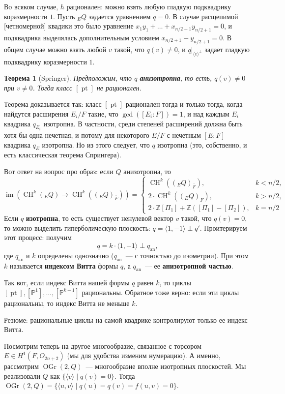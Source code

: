 \documentclass[a4paper]{article}
\DeclareMathOperator{\im}{im}
\DeclareMathOperator{\CH}{CH}
\DeclareMathOperator{\pt}{pt}
\DeclareMathOperator{\OGr}{OGr}
\DeclareMathOperator{\an}{an}
\newcommand{\term}{\textbf}
\newtheorem{theorem}{Теорема}[subsection]
\theoremstyle{definition}
\newcommand{\la}{\langle}
\newcommand{\ra}{\rangle}
\newcommand{\ol}{\overline}
\begin{document}
Во всяком случае, $h$ рационален: можно взять любую гладкую
подквадрику коразмерности $1$.
Пусть ${}_{E}Q$ задается уравнением $q=0$.
В случае расщепимой [четномерной] квадики это было уравнение
$x_1y_1 + \dots + x_{n/2+1}y_{n/2+1} = 0$,
и подквадрика выделялась дополнительным условием $x_{n/2+1} - y_{n/2+1}=0$.
В общем случае можно взять любой $v$ такой, что $q(v)\neq 0$,
и $q|_{\la v\ra^{\perp}}$ задает гладкую подквадрику коразмерности $1$.

\begin{theorem}[Springer]
Предположим, что $q$ \term{анизотропна}, то есть,
$q(v)\neq 0$ при $v\neq 0$.
Тогда класс $[\pt]$ не рационален.
\end{theorem}

Теорема доказывается так: класс $[\pt]$ рационален тогда и только тогда,
когда найдутся расширения $E_i/F$  такие, что
$\gcd([E_i:F]) = 1$, и над каждым $E_i$ квадрика
$q_{E_i}$ изотропна.
В частности, среди степеней расширений должна быть хотя бы одна нечетная,
и потому для некоторого $E/F$ с нечетным $[E:F]$ квадрика $q_E$
изотропна.
Но из этого следует, что $q$ изотропна (это, собственно, и есть
классическая теорема Спрингера).

Вот ответ на вопрос про образ: если $Q$ анизотропна,
то
\[
\im(\CH^k({}_{E}Q) \to \CH^k(({}_{E}Q)_{\ol{F}}))
= \begin{cases}
\CH^k(({}_{E}Q)_{\ol{F}}), & k < n/2, \\
2\cdot\CH^k(({}_{E}Q)_{\ol{F}}), & k > n/2, \\
2\cdot\mathbb{Z}[\Pi_1] + \mathbb{Z}([\Pi_1] - [\Pi_2]), & k = n/2
\end{cases} %
\]
Если $q$ \term{изотропна}, то есть существует ненулевой вектор $v$
такой, что $q(v) = 0$,
то можно выделить гиперболическую плоскость:
$q = \la 1,-1\ra \perp q'$.
Проитерируем этот процесс: получим
\[
q = k\cdot \la 1, -1\ra \perp q_{\an},
\]
где $q_{\an}$ и $k$ определены однозначно ($q_{\an}$~--- с точностью
до изометрии).
При этом $k$ называется \term{индексом Витта} формы $q$,
а $q_{\an}$~--- ее \term{анизотропной частью}.

Так вот, если индекс Витта нашей формы $q$ равен $k$,
то циклы $[\pt], [\mathbb{P}^1], \dots, [\mathbb{P}^{k-1}]$
рациональны.
Обратное тоже верно: если эти циклы рациональны, то индекс Витта
не меньше $k$.

Резюме: рациональные циклы на самой квадрике контролируют только
ее индекс Витта.

Посмотрим теперь на другое многообразие, связанное с торсором
$E\in H^1(F, O_{2n+2})$ (мы для удобства изменим нумерацию).
А именно, рассмотрим $\OGr(2,Q)$~--- многообразие вполне изотропных
плоскостей.
Мы реализовали $Q$ как $\{\la v\ra\mid q(v) = 0\}$.
Тогда $\OGr(2,Q) = \{\la u,v\ra\mid q(u) = q(v) = f(u,v) = 0\}$.
\end{document}
